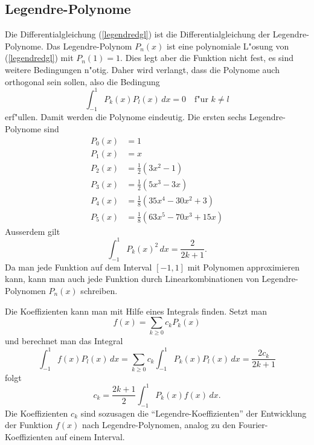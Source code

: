 \subsection{Legendre-Polynome}
Die Differentialgleichung (\ref{legendredgl}) ist die Differentialgleichung
der Legendre-Polynome.
Das Legendre-Polynom $P_n(x)$ ist eine polynomiale L"osung von
(\ref{legendredgl}) mit $P_n(1)=1$.
Dies legt aber die Funktion nicht fest, es sind weitere Bedingungen
n"otig. Daher wird verlangt, dass die Polynome auch orthogonal
sein sollen, also die Bedingung
\[
\int_{-1}^1 P_k(x)P_l(x)\,dx=0\quad\text{f"ur $k\ne l$}
\]
erf"ullen. Damit werden die Polynome eindeutig.
Die ersten sechs Legendre-Polynome sind
\begin{align*}
P_0(x)&=1\\
P_1(x)&=x\\
P_2(x)&=\frac12(3x^2-1)\\
P_3(x)&=\frac12(5x^3-3x)\\
P_4(x)&=\frac18(35x^4-30x^2+3)\\
P_5(x)&=\frac18(63x^5-70x^3+15x)
\end{align*}
Ausserdem gilt
\[
\int_{-1}^1 P_k(x)^2\,dx = \frac{2}{2k+1}.
\]
Da man 
jede Funktion auf dem Interval $[-1,1]$ mit Polynomen approximieren kann,
kann man auch jede Funktion durch Linearkombinationen von Legendre-Polynomen
$P_n(x)$ schreiben. 

Die Koeffizienten kann man mit Hilfe eines Integrals finden. Setzt man
\[
f(x)=\sum_{k\ge 0} c_k P_k(x)
\]
und berechnet man das Integral
\[
\int_{-1}^1 f(x)P_l(x)\,dx
=
\sum_{k\ge 0} c_k \int_{-1}^1 P_k(x)P_l(x)\,dx
=
\frac{2c_k}{2k+1}
\]
folgt
\[
c_k=\frac{2k+1}{2}\int_{-1}^1P_k(x)f(x)\,dx.
\]
Die Koeffizienten $c_k$ sind sozusagen die ``Legendre-Koeffizienten''
der Entwicklung der Funktion $f(x)$ nach Legendre-Polynomen,
analog zu den Fourier-Koeffizienten auf einem Interval.

